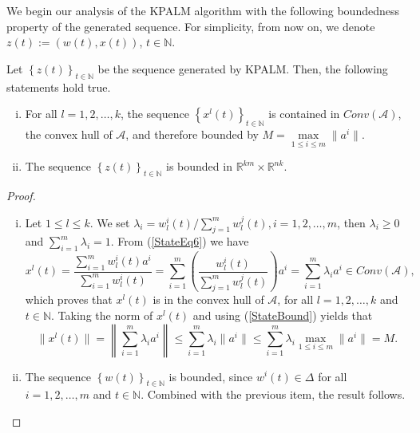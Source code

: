 We begin our analysis of the KPALM algorithm with the following boundedness property of the generated sequence. For simplicity, from now on, we denote $z(t):=\left( w(t),x(t) \right)$, $t \in \mathbb{N}$.
\begin{proposition} \label{boundedness_prop}
Let $\left\lbrace z(t) \right\rbrace_{t \in \mathbb{N}}$ be the sequence generated by KPALM. Then, the following statements hold true.
\begin{enumerate}[(i)]
	\item For all $l=1, 2, \ldots ,k$, the sequence $\left\lbrace x^l(t) \right\rbrace_{t \in \mathbb{N}}$ is contained in $Conv(\mathcal{A})$, the convex hull of $\mathcal{A}$, and therefore bounded by $M = \max\limits_{1 \leq i \leq m} \| a^i \|$. \label{boundedness_prop_1}
	\item The sequence $\left\lbrace z(t) \right\rbrace_{t \in \mathbb{N}}$ is bounded in $\mathbb{R}^{km} \times \mathbb{R}^{nk}$.
\end{enumerate}
\end{proposition}

\begin{proof}
\begin{enumerate}[(i)]
	\item  Let $1\leq l \leq k$. We set $\lambda_i = w^i_l(t)/\sum\limits_{j=1}^{m} w^j_l(t), i=1, 2, \ldots ,m$, then $\lambda_i \geq 0$ and $\sum\limits_{i=1}^{m} \lambda_i = 1$. From (\ref{StateEq6}) we have
	\begin{equation}
		x^l(t) = \frac{\sum_{i=1}^{m} w^i_l(t) a^i}{\sum_{i=1}^{m} w^i_l(t)} 
		= \sum_{i=1}^{m} \left( \frac{ w^i_l(t)}{\sum_{j=1}^{m} w^j_l(t)} \right) a^i 
		= \sum\limits_{i=1}^{m} \lambda_i a^i \in Conv(\mathcal{A}), \label{StateBound}
	\end{equation}
	which proves that $x^l(t)$ is in the convex hull of $\mathcal{A}$, for all $l = 1, 2, \ldots, k$ and $t \in \mathbb{N}$. Taking the norm of $x^l(t)$ and using (\ref{StateBound}) yields that
	\begin{equation*}
		\| x^l(t) \| = \left\lVert \sum_{i=1}^{m} \lambda_i a^i \right\lVert
		\leq \sum_{i=1}^{m} \lambda_i \| a^i \|
		\leq \sum_{i=1}^{m} \lambda_i \max\limits_{1 \leq i \leq m} \| a^i \| = M .
	\end{equation*}
	\item The sequence $\left\lbrace w(t) \right\rbrace_{t \in \mathbb{N}}$ is bounded, since $w^i(t) \in \Delta$ for all $i=1, 2, \ldots ,m$ and $t \in \mathbb{N}$. Combined with the previous item, the result follows.
\end{enumerate} 
\end{proof}

